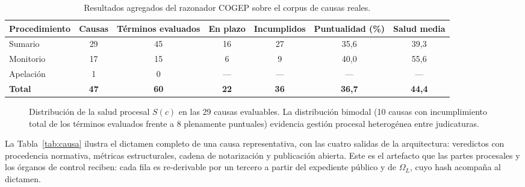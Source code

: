 \documentclass[computers,article,submit,pdftex,moreauthors]{Definitions/mdpi}
\begin{document}
\begin{table}[H]
\caption{Resultados agregados del razonador COGEP sobre el corpus de causas reales.}
\label{tab:resultados}
\begin{tabularx}{\textwidth}{Xcccccc}
\toprule
\textbf{Procedimiento} & \textbf{Causas} & \textbf{Términos evaluados} & \textbf{En plazo} & \textbf{Incumplidos} & \textbf{Puntualidad (\%)} & \textbf{Salud media}\\
\midrule
Sumario & 29 & 45 & 16 & 27 & 35{,}6 & 39{,}3\\
Monitorio & 17 & 15 & 6 & 9 & 40{,}0 & 55{,}6\\
Apelación & 1 & 0 & --- & --- & --- & ---\\
\midrule
\textbf{Total} & \textbf{47} & \textbf{60} & \textbf{22} & \textbf{36} & \textbf{36{,}7} & \textbf{44{,}4}\\
\bottomrule
\end{tabularx}
\end{table}

\begin{figure}[H]
\centering
{}
\caption{Distribución de la salud procesal $S(c)$ en las 29 causas evaluables. La distribución bimodal (10 causas con incumplimiento total de los términos evaluados frente a 8 plenamente puntuales) evidencia gestión procesal heterogénea entre judicaturas.}
\label{fig:hist}
\end{figure}

La Tabla~\ref{tab:causa} ilustra el dictamen completo de una causa representativa, con las cuatro salidas de la arquitectura: veredictos con procedencia normativa, métricas estructurales, cadena de notarización y publicación abierta. Este es el artefacto que las partes procesales y los órganos de control reciben: cada fila es re-derivable por un tercero a partir del expediente público y de $\Omega_L$, cuyo hash acompaña al dictamen.
\end{document}
